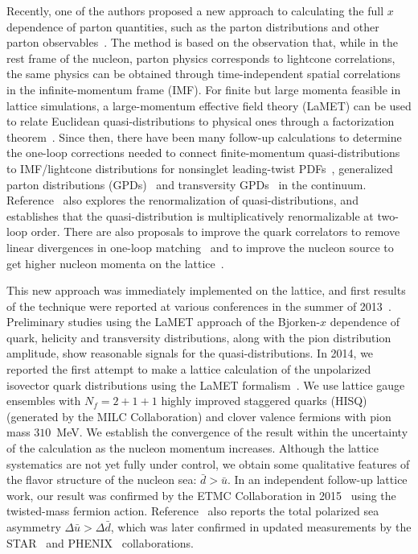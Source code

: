 Recently, one of the authors proposed a new approach to calculating the full 
$x$ dependence of parton quantities, such as the parton distributions and other
parton observables~\cite{Ji:2013dva}. The method is based on the observation
that, while in the rest frame of the nucleon, parton physics corresponds to
lightcone correlations, the same physics can be obtained through
time-independent spatial correlations in the infinite-momentum frame (IMF). For
finite but large momenta feasible in lattice simulations, a large-momentum
effective field theory (LaMET) can be used to relate Euclidean
quasi-distributions to physical ones through a factorization theorem~\cite{Ji:2014gla}.
Since then, there have been many follow-up calculations to determine the
one-loop corrections needed
to connect finite-momentum quasi-distributions to IMF/lightcone distributions 
for nonsinglet leading-twist PDFs~\cite{Xiong:2013bka}, generalized parton distributions (GPDs)~\cite{Ji:2015qla} and transversity GPDs~\cite{Xiong:2015nua} in the continuum. 
Reference~\cite{Ji:2015jwa} also explores the renormalization of quasi-distributions, and establishes that the quasi-distribution is multiplicatively renormalizable at two-loop order.  
There are also proposals to improve the quark correlators to remove linear divergences in one-loop matching~\cite{Li:2016amo} and to improve the nucleon source to get higher nucleon momenta on the lattice~\cite{Bali:2016lva}.
 
This new approach was immediately implemented on the lattice,
and first results of the technique were reported at various conferences in the summer of 2013~\cite{Lin:2014gaa,Lin:2014yra}.
Preliminary studies using the LaMET approach of the Bjorken-$x$ dependence of quark, helicity and transversity
distributions, along with the pion distribution amplitude, 
show reasonable signals for the quasi-distributions. 
In 2014, we reported the first attempt to make a lattice
calculation of the unpolarized isovector quark distributions using the LaMET
formalism~\cite{Lin:2014zya}. We use lattice gauge ensembles with $N_f=2+1+1$ highly improved staggered
quarks (HISQ) (generated by the MILC Collaboration) and
clover valence fermions with pion mass $310$~MeV. We establish the
convergence of the result within the
uncertainty of the calculation as the nucleon momentum increases. Although the lattice systematics are not yet
fully under control, we obtain some qualitative features of the flavor
structure of the nucleon sea: $\bar{d}>\bar{u}$.
In an independent follow-up lattice work, 
our result was confirmed by the ETMC Collaboration in 2015~\cite{Alexandrou:2015rja} using 
the twisted-mass fermion action. 
Reference~\cite{Lin:2014zya} also reports the total polarized sea asymmetry
$\Delta \bar{u}>\Delta \bar{d}$,
which was later confirmed in updated measurements by the STAR~\cite{Adamczyk:2014xyw} and PHENIX~\cite{Adare:2015gsd}
collaborations. 

